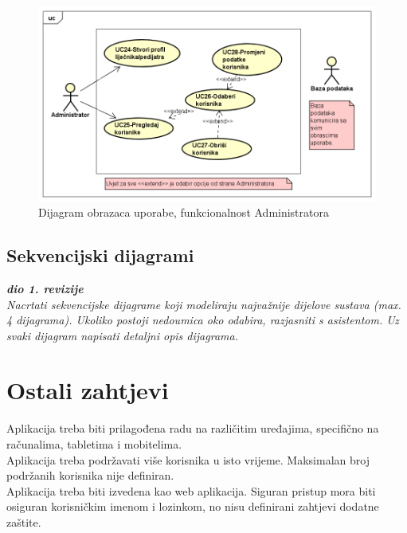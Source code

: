 					\begin{figure}[H]
						\includegraphics[scale=0.5]{dijagrami/usecase3.PNG} %
						\centering
						\caption{Dijagram obrazaca uporabe, funkcionalnost Administratora}
						\label{fig:usecase3}
					\end{figure}
				\eject		
				
			\subsection{Sekvencijski dijagrami}
				
				\textbf{\textit{dio 1. revizije}}\\
				
				\textit{Nacrtati sekvencijske dijagrame koji modeliraju najvažnije dijelove sustava (max. 4 dijagrama). Ukoliko postoji nedoumica oko odabira, razjasniti s asistentom. Uz svaki dijagram napisati detaljni opis dijagrama.}
				\eject
	
		\section{Ostali zahtjevi}
			 
			 \text Aplikacija treba biti prilagođena radu na različitim uređajima, specifično na računalima, tabletima i mobitelima. \\
			 \text Aplikacija treba podržavati više korisnika u isto vrijeme. Maksimalan broj podržanih korisnika nije definiran. \\
			 \text Aplikacija treba biti izvedena kao web aplikacija. Siguran pristup mora biti osiguran korisničkim imenom i lozinkom, no nisu definirani zahtjevi dodatne zaštite.
			 
			 
			 
	